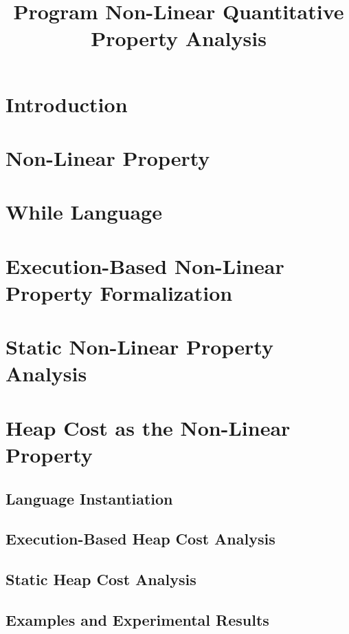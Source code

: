 \documentclass[a4paper,11pt]{article}
\begin{document}
\title{Program Non-Linear Quantitative Property Analysis}

\author{}

\date{}

\maketitle
%
\tableofcontents

% 
\section{Introduction}
% 
\section{Non-Linear Property}

\section{{While Language}}
\label{sec:language}

\clearpage
\section{Execution-Based Non-Linear Property Formalization}
\label{sec:exe}
\clearpage
\section{Static Non-Linear Property Analysis}
\label{sec:static}
\section{Heap Cost as the Non-Linear Property}
\label{sec:app-heap}
\subsection{Language Instantiation}
\subsection{Execution-Based Heap Cost Analysis}
\subsection{Static Heap Cost Analysis}
\subsection{Examples and Experimental Results}


\end{document}
